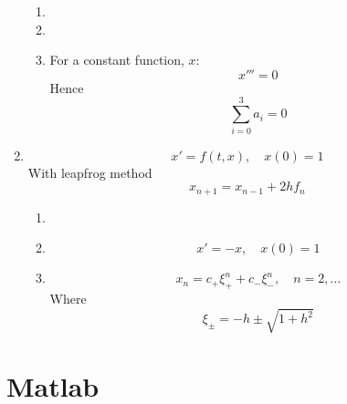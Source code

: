 \documentclass{X:/Documents/Coding/Latex/myassignment}
\begin{document}
\begin{enumerate}
	\begin{enumerate}
		\item %
		\item %
		\item %
		For a constant function, $x$: 
		\[x''' = 0\]
		Hence
		\[\sum_{i=0}^3 a_i = 0\]
	\end{enumerate}
	\item 
	\[x' = f(t,x),\quad x(0) = 1\]
	With leapfrog method
	\[x_{n+1} = x_{n-1} + 2h f_n\]
	\begin{enumerate}
		\item %
		\item %
		\[x' = -x, \quad x(0)=1\]

		\item %
		\[x_n = c_+ \xi_+^n + c_- \xi_-^n, \quad n=2,\ldots\]
		Where
		\[\xi_\pm = -h \pm \sqrt{1+h^2}\]
	\end{enumerate}
\end{enumerate}

\clearpage
\section*{Matlab}




\end{document}
